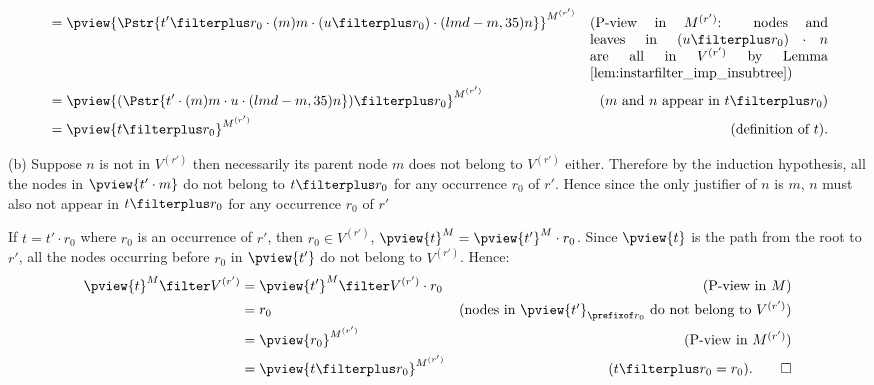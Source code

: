 \begin{compactitem}
\begin{align*}
            &= \pview{ \Pstr{t' \filterplus r_0 \cdot (m){m} \cdot {(u \filterplus r_0)} \cdot (lmd-m,35){n}}}^{M^{(r')}}
                & \parbox[t]{6cm}{(P-view in $M^{(r')}$: nodes and leaves in $(u \filterplus r_0) \cdot n$ are all in $V^{(r')}$
                    by Lemma \ref{lem:instarfilter_imp_insubtree})} \\
            &= \pview{ (\Pstr{t' \cdot (m){m} \cdot u \cdot (lmd-m,35){n}}) \filterplus r_0 }^{M^{(r')}}
                & (\mbox{$m$ and $n$ appear in $t\filterplus r_0$}) \\
            &= \pview{ t \filterplus r_0 }^{M^{(r')}}
                & \mbox{(definition of $t$).}
            \end{align*}

    (b) Suppose $n$ is not in $V^{(r')}$ then necessarily its parent node $m$ does not belong to $V^{(r')}$ either. Therefore by the induction hypothesis, all the nodes in $\pview{t' \cdot m}$ do not belong to
    $t\filterplus r_0$ for any occurrence $r_0$ of $r'$. Hence since the only justifier of $n$ is $m$, $n$ must also not appear in $t\filterplus r_0$ for any occurrence $r_0$ of $r'$


    \item If $t =  t' \cdot r_0$ where $r_0$ is an occurrence of $r'$, then $r_0 \in V^{(r')}$, $\pview{t}^M = \pview{t'}^M \cdot r_0$. Since $\pview{t}$ is the path from the root to $r'$, all the nodes occurring before $r_0$ in $\pview{t'}$ do not belong to $V^{(r')}$. Hence:
        \begin{align*}
        \pview{t}^M \filter V^{(r')}
            &=  \pview{t'}^M \filter V^{(r')} \cdot r_0 & (\mbox{P-view in $M$})\\
            &=  r_0                                     & (\mbox{nodes in $\pview{t'}_{\prefixof r_0}$ do not belong to $V^{(r')}$}) \\
            &=  \pview{r_0 }^{M^{(r')}}                 & (\mbox{P-view in $M^{(r')}$})\\
            &= \pview{t \filterplus  r_0 }^{M^{(r')}} & \mbox{($t \filterplus  r_0 = r_0$)}. \qed
        \end{align*}
    \end{compactitem}

